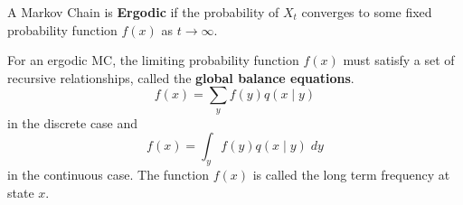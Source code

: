 \begin{defe} \label{defe: erogic_markov_chain}
    A Markov Chain is {\bf Ergodic} if the probability of $X_t$ converges to some fixed probability function $f(x)$ as $t \to \infty$.
\end{defe}

\begin{defe} \label{defe: gbe}
    For an ergodic MC, the limiting probability function $f(x)$ must satisfy a set of recursive relationships, called the {\bf global balance equations}.
    \[
        f(x) = \sum_{y} f(y) q \left( x \mid y \right)
    \]
    in the discrete case and
    \[
        f(x) = \int_y f(y) q(x \mid y) \; dy
    \]
    in the continuous case. The function $f(x)$ is called the long term frequency at state $x$.
\end{defe}

